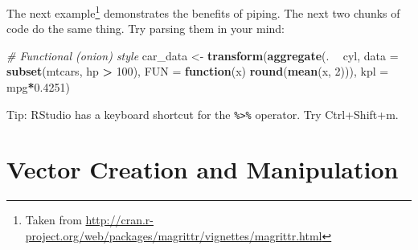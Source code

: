 \documentclass[]{book}
\newenvironment{Shaded}{\begin{snugshade}}{\end{snugshade}}
\newcommand{\CommentTok}[1]{\textcolor[rgb]{0.56,0.35,0.01}{\textit{#1}}}
\newcommand{\ControlFlowTok}[1]{\textcolor[rgb]{0.13,0.29,0.53}{\textbf{#1}}}
\newcommand{\DataTypeTok}[1]{\textcolor[rgb]{0.13,0.29,0.53}{#1}}
\newcommand{\DecValTok}[1]{\textcolor[rgb]{0.00,0.00,0.81}{#1}}
\newcommand{\FloatTok}[1]{\textcolor[rgb]{0.00,0.00,0.81}{#1}}
\newcommand{\KeywordTok}[1]{\textcolor[rgb]{0.13,0.29,0.53}{\textbf{#1}}}
\newcommand{\NormalTok}[1]{#1}
\newcommand{\OperatorTok}[1]{\textcolor[rgb]{0.81,0.36,0.00}{\textbf{#1}}}
\newcommand{\StringTok}[1]{\textcolor[rgb]{0.31,0.60,0.02}{#1}}
\theoremstyle{definition}
\theoremstyle{definition}
\theoremstyle{definition}
\theoremstyle{remark}
\begin{document}
The next example\footnote{Taken from \url{http://cran.r-project.org/web/packages/magrittr/vignettes/magrittr.html}} demonstrates the benefits of piping.
The next two chunks of code do the same thing.
Try parsing them in your mind:

\begin{Shaded}
\begin{Highlighting}[]
\CommentTok{# Functional (onion) style}
\NormalTok{car_data <-}\StringTok{ }
\StringTok{  }\KeywordTok{transform}\NormalTok{(}\KeywordTok{aggregate}\NormalTok{(. }\OperatorTok{~}\StringTok{ }\NormalTok{cyl, }
                      \DataTypeTok{data =} \KeywordTok{subset}\NormalTok{(mtcars, hp }\OperatorTok{>}\StringTok{ }\DecValTok{100}\NormalTok{), }
                      \DataTypeTok{FUN =} \ControlFlowTok{function}\NormalTok{(x) }\KeywordTok{round}\NormalTok{(}\KeywordTok{mean}\NormalTok{(x, }\DecValTok{2}\NormalTok{))), }
            \DataTypeTok{kpl =}\NormalTok{ mpg}\OperatorTok{*}\FloatTok{0.4251}\NormalTok{)}
\end{Highlighting}
\end{Shaded}

\begin{Shaded}
\end{Shaded}

Tip: RStudio has a keyboard shortcut for the \texttt{\%\textgreater{}\%} operator. Try Ctrl+Shift+m.

\hypertarget{vector-creation-and-manipulation}{%
\section{Vector Creation and Manipulation}\label{vector-creation-and-manipulation}}
\end{document}
